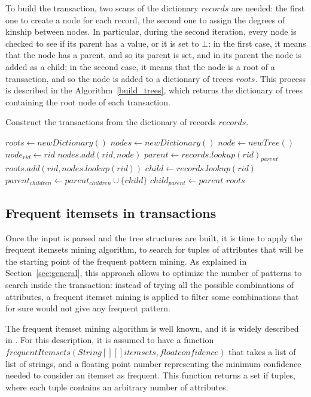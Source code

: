 \documentclass{acm_proc_article-sp-sigmod09}
\begin{document}
To build the transaction, two scans of the dictionary $records$ are needed: the first one to create a node for each record, the second one to assign the degrees of kinship between nodes. In particular, during the second iteration, every node is checked to see if its parent has a value, or it is set to $\bot$: in the first case, it means that the node has a parent, and so its parent is set, and in its parent the node is added as a child; in the second case, it means that the node is a root of a transaction, and so the node is added to a dictionary of treees $roots$. This process is described in the Algorithm~\ref{build_trees}, which returns the dictionary of trees containing the root node of each transaction.

\begin{algorithm}
\caption{Construct the transactions from the dictionary of records $records$.}
\label{build_trees}
\begin{algorithmic}[1]
\State $roots \gets new Dictionary()$
\State $nodes \gets new Dictionary()$
	\State $node \gets new Tree()$ 
	\State $node_{rid} \gets rid$
	\State $nodes.add(rid, node)$
\EndFor
{}
	\State $parent \gets records.lookup(rid)_{parent}$
		\State $roots.add(rid, nodes.lookup(rid))$
	\Else
		\State $child \gets records.lookup(rid)$
		\State $parent_{children} \gets parent_{children} \cup \{child\}$
		\State $child_{parent} \gets parent$
	\EndIf
\EndFor
\Return $roots$
\EndFunction
\end{algorithmic}
\end{algorithm}

\subsection{Frequent itemsets in transactions}
Once the input is parsed and the tree structures are built, it is time to apply the frequent itemsets mining algorithm, to search for tuples of attributes that will be the starting point of the frequent pattern mining. As explained in Section~\ref{sec:general}, this approach allows to optimize the number of patterns to search inside the transaction: instead of trying all the possible combinations of attributes, a frequent itemset mining is applied to filter some combinations that for sure would not give any frequent pattern.

The frequent itemset mining algorithm is well known, and it is widely described in \cite{agrawal1994fast}. For this description, it is assumed to have a function $frequentItemsets(String[][] itemsets, float confidence)$ that takes a list of list of strings, and a floating point number representing the minimum confidence needed to consider an itemset as frequent. This function returns a set if tuples, where each tuple contains an arbitrary number of attributes.
\end{document}
